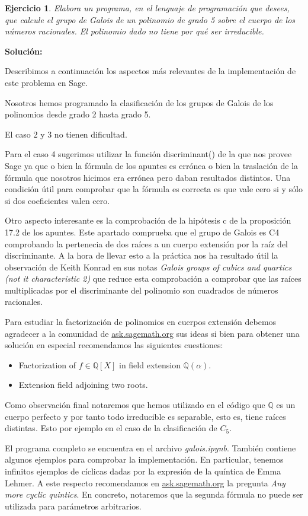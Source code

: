 \documentclass{article}
\theoremstyle{theorem-style}  %
\theoremstyle{definition-style}
\theoremstyle{example-style}
\newtheorem{exercise}{Ejercicio}[section]
\begin{document}
\begin{exercise}
Elabora un programa, en el lenguaje de programación que desees, que calcule el grupo de Galois de un polinomio de grado 5 sobre el cuerpo de los números racionales. El polinomio dado no tiene por qué ser irreducible.
\end{exercise}

\textbf{Solución:}

Describimos a continuación los aspectos más relevantes de la implementación de este problema en Sage. 

Nosotros hemos programado la clasificación de los grupos de Galois de los polinomios desde grado 2 hasta grado 5. 

El caso 2 y 3 no tienen dificultad. 

Para el caso 4 sugerimos utilizar la función discriminant() de la que nos provee Sage ya que o bien la fórmula de los apuntes es errónea o bien la traslación de la fórmula que nosotros hicimos era errónea pero daban resultados distintos. Una condición útil para comprobar que la fórmula es correcta es que vale cero si y sólo si dos coeficientes valen cero. 

Otro aspecto interesante es la comprobación de la hipótesis c de la proposición 17.2 de los apuntes. Este apartado comprueba que el grupo de Galois es C4 comprobando la pertenecia de dos raíces a un cuerpo extensión por la raíz del discriminante. A la hora de llevar esto a la práctica nos ha resultado útil la observación de Keith Konrad en sus notas \textit{Galois groups of cubics and quartics (not it characteristic 2)} que reduce esta comprobación a comprobar que las raíces multiplicadas por el discriminante del polinomio son cuadrados de números racionales. 

Para estudiar la factorización de polinomios en cuerpos extensión debemos agradecer a la comunidad de \url{ask.sagemath.org} sus ideas si bien para obtener una solución en especial recomendamos las siguientes cuestiones:

\begin{itemize}
\item Factorization of $f \in \mathbb{Q}[X]$ in field extension $\mathbb{Q}(\alpha)$.
\item Extension field adjoining two roots.
\end{itemize}


Como observación final notaremos que hemos utilizado en el código que $\mathbb{Q}$ es un cuerpo perfecto y por tanto todo irreducible es separable, esto es, tiene raíces distintas. Esto por ejemplo en el caso de la clasificación de $C_5$. 

El programa completo se encuentra en el archivo \textit{galois.ipynb}. También contiene algunos ejemplos para comprobar la implementación. En particular, tenemos infinitos ejemplos de cíclicas dadas por la expresión de la quíntica de Emma Lehmer. A este respecto recomendamos en \url{ask.sagemath.org} la pregunta \textit{Any more cyclic quintics}. En concreto, notaremos que la segunda fórmula no puede ser utilizada para parámetros arbitrarios. 






\printbibliography
\end{document}

